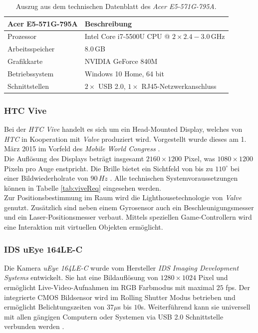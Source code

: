 \begin{table}
	\centering
	\begin{tabular}{|l|l|}
		\hline
		\Absatzbox{}
		\textbf{Acer E5-571G-795A}& \textbf{Beschreibung} \\
		\hline
		Prozessor & Intel Core i7-5500U CPU @ $2\times 2.4-3.0$\,GHz\\
		\hline
		Arbeitsspeicher & $8.0$\,GB \\
		\hline 
		Grafikkarte & NVIDIA GeForce 840M\\
		\hline
		Betriebssystem & Windows 10 Home, 64 bit \\
		\hline
		Schnittstellen & $2\times$ USB 2.0, $1\times$ RJ45-Netzwerkanschluss\\
		\hline
	\end{tabular}
	\caption{Auszug aus dem technischen Datenblatt des \textit{Acer E5-571G-795A}.}
	\label{tab:TrackingCompParam}
\end{table}


\subsubsection{HTC Vive}\label{sec:Vive} 
Bei der \textit{HTC Vive} handelt es sich um ein Head-Mounted Display, welches von \textit{HTC} in Kooperation mit \textit{Valve} \cite{website:Valve} produziert wird. Vorgestellt wurde dieses am 1. März 2015 im Vorfeld des \textit{Mobile World Congress} \cite{website:mobileworldcongress}.\\
Die Auflösung des Displays beträgt insgesamt $2160\times1200$ Pixel, was $1080\times1200$ Pixeln pro Auge enstpricht. Die Brille bietet ein Sichtfeld von bis zu $110^\circ$ bei einer Bildwiederholrate von $90\,Hz$ \cite{website:HTC_Vive}. Alle technischen Systemvoraussetzungen können in Tabelle \ref{tab:viveReq} eingesehen werden. \\
Zur Positionsbestimmung im Raum wird die Lighthousetechnologie von \textit{Valve} genutzt. Zusätzlich sind neben einem Gyrosensor auch ein Beschleunigungsmesser und ein Laser-Positionsmesser verbaut. Mittels speziellen Game-Controllern wird eine Interaktion mit virtuellen Objekten ermöglicht.

\subsubsection{IDS uEye 164LE-C}\label{sec:uEye} 
Die Kamera \textit{uEye 164LE-C} wurde vom Hersteller \textit{IDS Imaging Development Systems} entwickelt. Sie hat eine Bildauflösung von $1280 \times 1024$ Pixel und ermöglicht Live-Video-Aufnahmen im RGB Farbmodus mit maximal $25$ fps. Der integrierte CMOS Bildsensor wird im Rolling Shutter Modus betrieben und ermöglicht Belichtungszeiten von $37\mu$s bis $10$s. Weiterführend kann sie universell mit allen gängigen Computern oder Systemen via USB 2.0 Schnittstelle verbunden werden \cite{website:UEyeTechSpec}.\\

